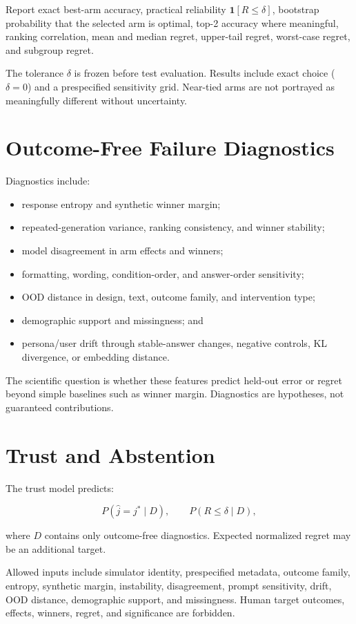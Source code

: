 \documentclass[11pt]{article}
\begin{document}
Report exact best-arm accuracy, practical reliability $\mathbf{1}[R\leq\delta]$, bootstrap probability that the selected arm is optimal, top-2 accuracy where meaningful, ranking correlation, mean and median regret, upper-tail regret, worst-case regret, and subgroup regret.

The tolerance $\delta$ is frozen before test evaluation. Results include exact choice ($\delta=0$) and a prespecified sensitivity grid. Near-tied arms are not portrayed as meaningfully different without uncertainty.

\section{Outcome-Free Failure Diagnostics}

Diagnostics include:

\begin{itemize}
\item response entropy and synthetic winner margin;
\item repeated-generation variance, ranking consistency, and winner stability;
\item model disagreement in arm effects and winners;
\item formatting, wording, condition-order, and answer-order sensitivity;
\item OOD distance in design, text, outcome family, and intervention type;
\item demographic support and missingness; and
\item persona/user drift through stable-answer changes, negative controls, KL divergence, or embedding distance.
\end{itemize}

The scientific question is whether these features predict held-out error or regret beyond simple baselines such as winner margin. Diagnostics are hypotheses, not guaranteed contributions.

\section{Trust and Abstention}

The trust model predicts:

\[
P(\hat{j}=j^*\mid D), \qquad
P(R\leq\delta\mid D),
\]

where $D$ contains only outcome-free diagnostics. Expected normalized regret may be an additional target.

Allowed inputs include simulator identity, prespecified metadata, outcome family, entropy, synthetic margin, instability, disagreement, prompt sensitivity, drift, OOD distance, demographic support, and missingness. Human target outcomes, effects, winners, regret, and significance are forbidden.
\end{document}
